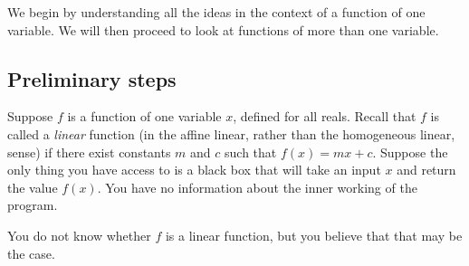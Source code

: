 \documentclass[10pt]{amsart}
\begin{document}
We begin by understanding all the ideas in the context of a function
of one variable. We will then proceed to look at functions of more
than one variable.

\subsection{Preliminary steps}

Suppose $f$ is a function of one variable $x$, defined for all
reals. Recall that $f$ is called a {\em linear} function (in the
affine linear, rather than the homogeneous linear, sense) if there
exist constants $m$ and $c$ such that $f(x) = mx + c$. Suppose the
only thing you have access to is a black box that will take an input
$x$ and return the value $f(x)$. You have no information about the
inner working of the program.

You do not know whether $f$ is a linear function, but you believe that
that may be the case. 
\end{document}
